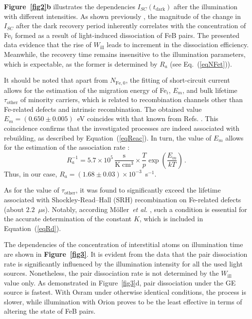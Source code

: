\documentclass{WileyMSP-template}
\begin{document}
\textbf{Figure~\ref{fig2}b} illustrates the dependencies $I_{SC}(t_\mathrm{dark})$ after the illumination with different intensities.
As shown previously \cite{Olikh2021JAP}, the magnitude of the change in $I_{SC}$ after the dark recovery period
inherently correlates with the concentration of Fe$_i$ formed as a result of light-induced dissociation of FeB pairs.
The presented data evidence that the rise of $W_\mathrm{ill}$ leads to increment in the dissociation efficiency.
Meanwhile, the recovery time remains insensitive to the illumination parameters, which is expectable, as the former is determined by $R_a$ (see Eq.~(\ref{eqNFet})).

It should be noted that apart from $N_\mathrm{Fe,0}$,
the fitting of short-circuit current \cite{Olikh2022:JMatSci,Olikh2021JAP} allows for the estimation of the migration energy of Fe$_i$, $E_m$,
and bulk lifetime $\tau_\mathrm{other}$ of minority carriers, which is related to recombination channels other than Fe-related defects and intrinsic recombination.
The obtained value $E_m=(0.650\pm0.005)$~eV coincides with that known from Refs. \cite{FeBKin2019,FeBAssSST2011,FeBkinAPL2008}.
This coincidence confirms that the investigated processes are indeed associated with rebuilding,
as described by Equation~(\ref{eqReac}).
In turn, the value of $E_m$ allows for the estimation of the association rate \cite{FeBAssJAP2014,FeBKin2019,FeBAssSST2011}:
\begin{equation}
\label{eqTass}
R_a^{-1}=5.7\times10^5\,\frac{\mathrm{s}}{\mathrm{K}\;\mathrm{cm}^3}\times\frac{T}{p}\exp\left(\frac{E_m}{kT}\right)\,.
\end{equation}
Thus, in our case, $R_a=(1.68\pm0.03)\times10^{-3}$~s$^{-1}$.

As for the value of $\tau_\mathrm{other}$, it was found to significantly exceed the
lifetime associated with Shockley-Read–Hall (SRH) recombination on Fe-related defects (about $2.2$~$\mu$s).
Notably, according M\"{o}ller~\emph{et al.} \cite{FeBAssJAP2014},
such a condition is essential for the accurate determination of the constant $K$, which is included in Equation~(\ref{eqRd}).


The dependencies of the concentration of interstitial atoms on illumination time are shown in \textbf{Figure~\ref{fig3}}.
It is evident from the data that the pair dissociation rate is significantly influenced by the illumination intensity for all the used light sources.
Nonetheless, the pair dissociation rate is not determined by the $W_\mathrm{ill}$ value only.
As demonstrated in Figure~\ref{fig3}d, pair dissociation under the GE source is fastest.
With Osram under otherwise identical conditions, the process is slower,
while illumination with Orion proves to be the least effective in terms of altering the state of FeB pairs.
\end{document}

